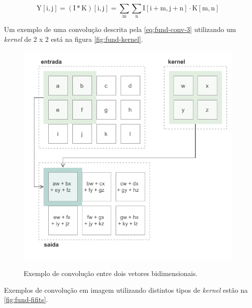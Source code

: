 
\begin{equation} \label{eq:fund-conv-3}
\mathrm{
 Y[i, j] = (I \ast K)[i, j] = \sum_{m} \sum_{n} I[i + m,j + n] \cdot K [m,n]
}
\end{equation}

Um exemplo de uma convolução descrita pela \autoref{eq:fund-conv-3} utilizando um \textit{kernel} de 2 x 2 está na figura \autoref{fig:fund-kernel}.

\begin{figure}[H] %
  \centering
  \caption{Exemplo de convolução entre dois vetores bidimensionais.}
  \includegraphics[scale=1.1]{img/img-fundamentacao-kernel.pdf}
  \label{fig:fund-kernel}
\end{figure}

Exemplos de convolução em imagem utilizando distintos tipos de \textit{kernel} estão na \autoref{fig:fund-fifits}.

